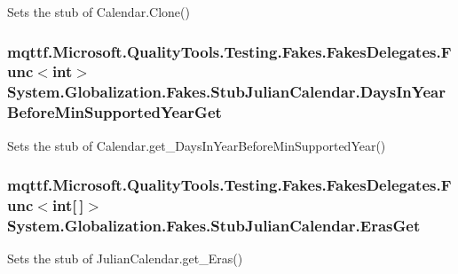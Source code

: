 Sets the stub of Calendar.\-Clone()

\hypertarget{class_system_1_1_globalization_1_1_fakes_1_1_stub_julian_calendar_adb1db643c9b905df0425df1bf6ac51de}{
\subsubsection[{Days\-In\-Year\-Before\-Min\-Supported\-Year\-Get}]{\setlength{\rightskip}{0pt plus 5cm}mqttf.\-Microsoft.\-Quality\-Tools.\-Testing.\-Fakes.\-Fakes\-Delegates.\-Func$<$int$>$ System.\-Globalization.\-Fakes.\-Stub\-Julian\-Calendar.\-Days\-In\-Year\-Before\-Min\-Supported\-Year\-Get}}\label{class_system_1_1_globalization_1_1_fakes_1_1_stub_julian_calendar_adb1db643c9b905df0425df1bf6ac51de}


Sets the stub of Calendar.\-get\-\_\-\-Days\-In\-Year\-Before\-Min\-Supported\-Year()

\hypertarget{class_system_1_1_globalization_1_1_fakes_1_1_stub_julian_calendar_ad87a13f96872b6c28c87d7ae44f21ca0}{
\subsubsection[{Eras\-Get}]{\setlength{\rightskip}{0pt plus 5cm}mqttf.\-Microsoft.\-Quality\-Tools.\-Testing.\-Fakes.\-Fakes\-Delegates.\-Func$<$int\mbox{[}$\,$\mbox{]}$>$ System.\-Globalization.\-Fakes.\-Stub\-Julian\-Calendar.\-Eras\-Get}}\label{class_system_1_1_globalization_1_1_fakes_1_1_stub_julian_calendar_ad87a13f96872b6c28c87d7ae44f21ca0}


Sets the stub of Julian\-Calendar.\-get\-\_\-\-Eras()

